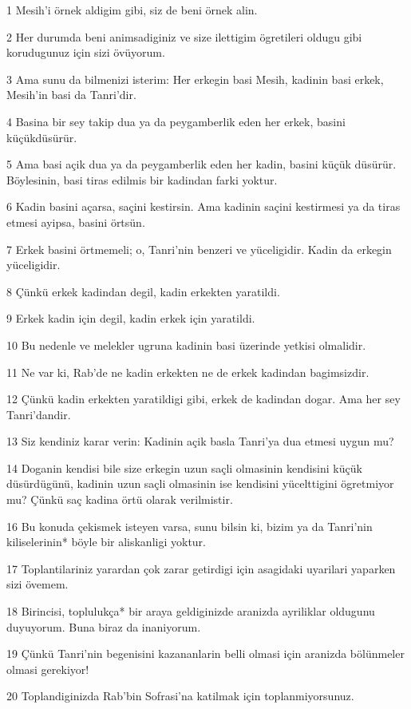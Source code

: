 \par 1 Mesih'i örnek aldigim gibi, siz de beni örnek alin.
\par 2 Her durumda beni animsadiginiz ve size ilettigim ögretileri oldugu gibi korudugunuz için sizi övüyorum.
\par 3 Ama sunu da bilmenizi isterim: Her erkegin basi Mesih, kadinin basi erkek, Mesih'in basi da Tanri'dir.
\par 4 Basina bir sey takip dua ya da peygamberlik eden her erkek, basini küçükdüsürür.
\par 5 Ama basi açik dua ya da peygamberlik eden her kadin, basini küçük düsürür. Böylesinin, basi tiras edilmis bir kadindan farki yoktur.
\par 6 Kadin basini açarsa, saçini kestirsin. Ama kadinin saçini kestirmesi ya da tiras etmesi ayipsa, basini örtsün.
\par 7 Erkek basini örtmemeli; o, Tanri'nin benzeri ve yüceligidir. Kadin da erkegin yüceligidir.
\par 8 Çünkü erkek kadindan degil, kadin erkekten yaratildi.
\par 9 Erkek kadin için degil, kadin erkek için yaratildi.
\par 10 Bu nedenle ve melekler ugruna kadinin basi üzerinde yetkisi olmalidir.
\par 11 Ne var ki, Rab'de ne kadin erkekten ne de erkek kadindan bagimsizdir.
\par 12 Çünkü kadin erkekten yaratildigi gibi, erkek de kadindan dogar. Ama her sey Tanri'dandir.
\par 13 Siz kendiniz karar verin: Kadinin açik basla Tanri'ya dua etmesi uygun mu?
\par 14 Doganin kendisi bile size erkegin uzun saçli olmasinin kendisini küçük düsürdügünü, kadinin uzun saçli olmasinin ise kendisini yücelttigini ögretmiyor mu? Çünkü saç kadina örtü olarak verilmistir.
\par 16 Bu konuda çekismek isteyen varsa, sunu bilsin ki, bizim ya da Tanri'nin kiliselerinin* böyle bir aliskanligi yoktur.
\par 17 Toplantilariniz yarardan çok zarar getirdigi için asagidaki uyarilari yaparken sizi övemem.
\par 18 Birincisi, toplulukça* bir araya geldiginizde aranizda ayriliklar oldugunu duyuyorum. Buna biraz da inaniyorum.
\par 19 Çünkü Tanri'nin begenisini kazananlarin belli olmasi için aranizda bölünmeler olmasi gerekiyor!
\par 20 Toplandiginizda Rab'bin Sofrasi'na katilmak için toplanmiyorsunuz.
